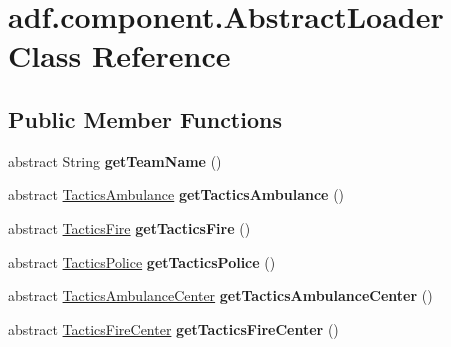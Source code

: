 \hypertarget{classadf_1_1component_1_1AbstractLoader}{}\section{adf.\+component.\+Abstract\+Loader Class Reference}
\label{classadf_1_1component_1_1AbstractLoader}
\subsection*{Public Member Functions}
\begin{DoxyCompactItemize}
\item 
\hypertarget{classadf_1_1component_1_1AbstractLoader_a295d96c63465aa594b5b8a8137cbfd96}{}\label{classadf_1_1component_1_1AbstractLoader_a295d96c63465aa594b5b8a8137cbfd96} 
abstract String {\bfseries get\+Team\+Name} ()
\item 
\hypertarget{classadf_1_1component_1_1AbstractLoader_aa51ed4518181e2fb4ecc2ede1a37c095}{}\label{classadf_1_1component_1_1AbstractLoader_aa51ed4518181e2fb4ecc2ede1a37c095} 
abstract \hyperlink{classadf_1_1component_1_1tactics_1_1TacticsAmbulance}{Tactics\+Ambulance} {\bfseries get\+Tactics\+Ambulance} ()
\item 
\hypertarget{classadf_1_1component_1_1AbstractLoader_a65bd38d51297afe669f520a06a8370a5}{}\label{classadf_1_1component_1_1AbstractLoader_a65bd38d51297afe669f520a06a8370a5} 
abstract \hyperlink{classadf_1_1component_1_1tactics_1_1TacticsFire}{Tactics\+Fire} {\bfseries get\+Tactics\+Fire} ()
\item 
\hypertarget{classadf_1_1component_1_1AbstractLoader_a3d3610a866da0281a666f89ffff97e81}{}\label{classadf_1_1component_1_1AbstractLoader_a3d3610a866da0281a666f89ffff97e81} 
abstract \hyperlink{classadf_1_1component_1_1tactics_1_1TacticsPolice}{Tactics\+Police} {\bfseries get\+Tactics\+Police} ()
\item 
\hypertarget{classadf_1_1component_1_1AbstractLoader_a0afe21d2d55505b46df627f85502aa6b}{}\label{classadf_1_1component_1_1AbstractLoader_a0afe21d2d55505b46df627f85502aa6b} 
abstract \hyperlink{classadf_1_1component_1_1tactics_1_1center_1_1TacticsAmbulanceCenter}{Tactics\+Ambulance\+Center} {\bfseries get\+Tactics\+Ambulance\+Center} ()
\item 
\hypertarget{classadf_1_1component_1_1AbstractLoader_a32716db04b546a68b4ca8e4428d8c378}{}\label{classadf_1_1component_1_1AbstractLoader_a32716db04b546a68b4ca8e4428d8c378} 
abstract \hyperlink{classadf_1_1component_1_1tactics_1_1center_1_1TacticsFireCenter}{Tactics\+Fire\+Center} {\bfseries get\+Tactics\+Fire\+Center} ()

\end{DoxyCompactItemize}
